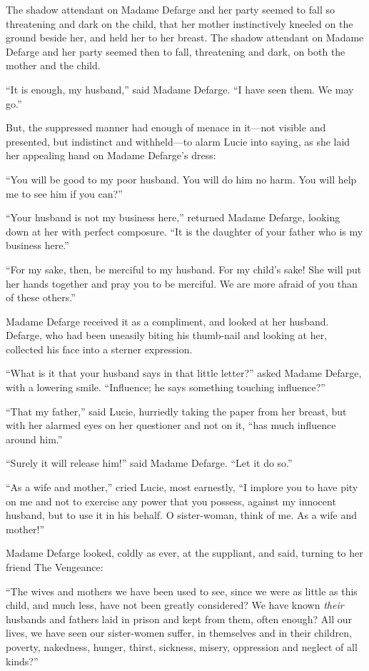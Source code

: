 The shadow attendant on Madame Defarge and her party seemed to fall
so threatening and dark on the child, that her mother instinctively
kneeled on the ground beside her, and held her to her breast.  The
shadow attendant on Madame Defarge and her party seemed then to fall,
threatening and dark, on both the mother and the child.

``It is enough, my husband,'' said Madame Defarge.  ``I have seen them.
We may go.''

But, the suppressed manner had enough of menace in it---not visible
and presented, but indistinct and withheld---to alarm Lucie into
saying, as she laid her appealing hand on Madame Defarge's dress:

``You will be good to my poor husband.  You will do him no harm.
You will help me to see him if you can?''

``Your husband is not my business here,'' returned Madame Defarge,
looking down at her with perfect composure.  ``It is the daughter of
your father who is my business here.''

``For my sake, then, be merciful to my husband.  For my child's sake!
She will put her hands together and pray you to be merciful.  We are
more afraid of you than of these others.''

Madame Defarge received it as a compliment, and looked at her
husband.  Defarge, who had been uneasily biting his thumb-nail and
looking at her, collected his face into a sterner expression.

``What is it that your husband says in that little letter?''  asked
Madame Defarge, with a lowering smile.  ``Influence; he says something
touching influence?''

``That my father,'' said Lucie, hurriedly taking the paper from her
breast, but with her alarmed eyes on her questioner and not on it,
``has much influence around him.''

``Surely it will release him!'' said Madame Defarge.  ``Let it do so.''

``As a wife and mother,'' cried Lucie, most earnestly, ``I implore you
to have pity on me and not to exercise any power that you possess,
against my innocent husband, but to use it in his behalf.
O sister-woman, think of me.  As a wife and mother!''

Madame Defarge looked, coldly as ever, at the suppliant, and said,
turning to her friend The Vengeance:

``The wives and mothers we have been used to see, since we were as
little as this child, and much less, have not been greatly
considered?  We have known \emph{their} husbands and fathers laid in prison
and kept from them, often enough?  All our lives, we have seen our
sister-women suffer, in themselves and in their children, poverty,
nakedness, hunger, thirst, sickness, misery, oppression and neglect
of all kinds?''

